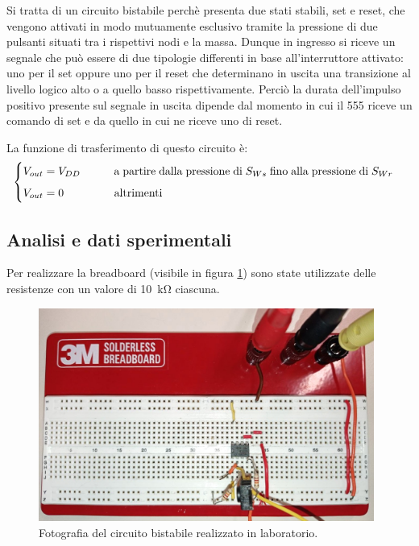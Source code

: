 \documentclass{report}
\begin{document}
\noindent Si tratta di un circuito bistabile perchè presenta due stati stabili, set e reset, che vengono attivati in modo mutuamente esclusivo tramite la pressione di due pulsanti situati tra i rispettivi nodi e la massa. Dunque in ingresso si riceve un segnale che può essere di due tipologie differenti in base all'interruttore attivato: uno per il set oppure uno per il reset che determinano in uscita una transizione al livello logico alto o a quello basso rispettivamente. Perciò la durata dell'impulso positivo presente sul segnale in uscita dipende dal momento in cui il 555 riceve un comando di set e da quello in cui ne riceve uno di reset.

La funzione di trasferimento di questo circuito è:
\begin{equation}
	\begin{cases}
		V_{out}= V_{DD}\indent\indent \mathrm{a\;partire\;dalla\;pressione\;di\;} S_{Ws} \mathrm{\;fino\;alla\;pressione\;di\;} S_{Wr}\\[5pt]
		V_{out}= 0\indent\indent\indent \mathrm{altrimenti}\\
	\end{cases}
\end{equation}

\subsection{Analisi e dati sperimentali}
Per realizzare la breadboard (visibile in figura \ref{figura:circuito2}) sono state utilizzate delle resistenze con un valore di \SI{10}{\kilo\ohm} ciascuna.

\begin{figure}[h!]
	\centering
	\includegraphics[height=7cm]{immagini/circuito2}
	\caption{Fotografia del circuito bistabile realizzato in laboratorio.}
	\label{figura:circuito2}
\end{figure}
\end{document}

